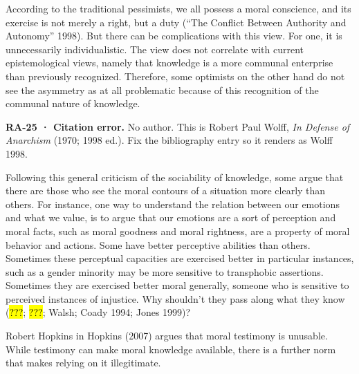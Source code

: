 \documentclass[
  letterpaper,
  DIV=11,
  numbers=noendperiod]{scrartcl}
\theoremstyle{remark}
\begin{document}
According to the traditional pessimists, we all possess a moral
conscience, and its exercise is not merely a right, but a duty (``The
Conflict Between Authority and Autonomy'' 1998). But there can be
complications with this view. For one, it is unnecessarily
individualistic. The view does not correlate with current
epistemological views, namely that knowledge is a more communal
enterprise than previously recognized. Therefore, some optimists on the
other hand do not see the asymmetry as at all problematic because of
this recognition of the communal nature of knowledge.

\begin{tcolorbox}[enhanced jigsaw, arc=.35mm, bottomrule=.15mm, bottomtitle=1mm, breakable, colback=white, colbacktitle=quarto-callout-warning-color!10!white, colframe=quarto-callout-warning-color-frame, coltitle=black, left=2mm, leftrule=.75mm, opacityback=0, opacitybacktitle=0.6, rightrule=.15mm, title=\textcolor{quarto-callout-warning-color}{\faExclamationTriangle}\hspace{0.5em}{Warning}, titlerule=0mm, toprule=.15mm, toptitle=1mm]

\textbf{RA-25 · Citation error.} No author. This is Robert Paul Wolff,
\emph{In Defense of Anarchism} (1970; 1998 ed.). Fix the bibliography
entry so it renders as Wolff 1998.

\end{tcolorbox}

Following this general criticism of the sociability of knowledge, some
argue that there are those who see the moral contours of a situation
more clearly than others. For instance, one way to understand the
relation between our emotions and what we value, is to argue that our
emotions are a sort of perception and moral facts, such as moral
goodness and moral rightness, are a property of moral behavior and
actions. Some have better perceptive abilities than others. Sometimes
these perceptual capacities are exercised better in particular
instances, such as a gender minority may be more sensitive to
transphobic assertions. Sometimes they are exercised better moral
generally, someone who is sensitive to perceived instances of injustice.
Why shouldn't they pass along what they know (\hl{???}; \hl{???}; Walsh;
Coady 1994; Jones 1999)?

Robert Hopkins in Hopkins (2007) argues that moral testimony is
unusable. While testimony can make moral knowledge available, there is a
further norm that makes relying on it illegitimate.
\end{document}
